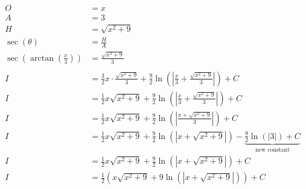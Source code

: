 \documentclass[12pt]{article}
\begin{document}
\begin{align}
    O                                                & = x                                                                                                                                               \\
    A                                                & = 3                                                                                                                                               \\
    H                                                & = \sqrt{x^2+9}                                                                                                                                    \\
    \sec(\theta)                                     & = \frac{H}{A}                                                                                                                                     \\
    \sec\left(\arctan\left(\frac{x}{3}\right)\right) & = \frac{\sqrt{x^2+9}}{3}                                                                                                                          \\
    \nonumber                                                                                                                                                                                            \\
    I                                                & = \frac{3}{2}x\cdot\frac{\sqrt{x^2+9}}{3} + \frac{9}{2}\ln\left(\left|\frac{x}{3}+\frac{\sqrt{x^2+9}}{3}\right|\right) + C                        \\
    I                                                & = \frac{1}{2}x\sqrt{x^2+9} + \frac{9}{2}\ln\left(\left|\frac{x}{3}+\frac{\sqrt{x^2+9}}{3}\right|\right) + C                                       \\
    I                                                & = \frac{1}{2}x\sqrt{x^2+9} + \frac{9}{2}\ln\left(\left|\frac{x+\sqrt{x^2+9}}{3}\right|\right) + C                                                 \\
    I                                                & = \frac{1}{2}x\sqrt{x^2+9} + \frac{9}{2}\ln\left(\left|x+\sqrt{x^2+9}\right|\right) - \underbrace{\frac{9}{2} \ln(|3|) + C}_{\text{new constant}} \\
    I                                                & = \frac{1}{2}x\sqrt{x^2+9} + \frac{9}{2}\ln\left(\left|x+\sqrt{x^2+9}\right|\right) + C                                                           \\
    I                                                & = \frac{1}{2}\left(x\sqrt{x^2+9} + 9\ln\left(\left|x+\sqrt{x^2+9}\right|\right)\right) + C
\end{align}
\end{document}
